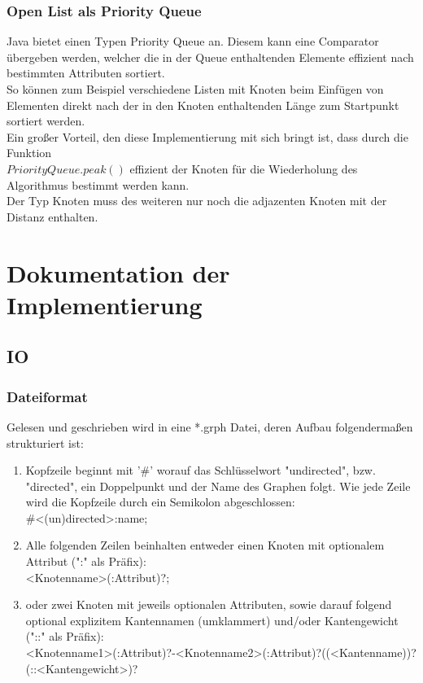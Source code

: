 \documentclass[a4paper]{article}
\begin{document}
\subsubsection{Open List als Priority Queue} \label{priorityQueueSection}

Java bietet einen Typen Priority Queue an. Diesem kann eine Comparator übergeben werden, welcher die in der Queue enthaltenden Elemente effizient nach bestimmten Attributen sortiert.\\
So können zum Beispiel verschiedene Listen mit Knoten beim Einfügen von Elementen direkt nach der in den Knoten enthaltenden Länge zum Startpunkt sortiert werden.\\
Ein großer Vorteil, den diese Implementierung mit sich bringt ist, dass durch die Funktion\\$PriorityQueue.peak()$ effizient der Knoten für die Wiederholung des Algorithmus bestimmt werden kann.\\
Der Typ Knoten muss des weiteren nur noch die adjazenten Knoten mit der Distanz enthalten.\\

\section{Dokumentation der Implementierung}

\subsection{IO}

\subsubsection{Dateiformat}
Gelesen und geschrieben wird in eine *.grph Datei, deren Aufbau folgendermaßen strukturiert ist:
\begin{enumerate}
 	\item Kopfzeile beginnt mit '\#' worauf das Schlüsselwort "undirected", bzw. "directed", ein Doppelpunkt und der Name des Graphen folgt. Wie jede Zeile wird die Kopfzeile durch ein Semikolon abgeschlossen:\\
		\#<(un)directed>:name;
	\item Alle folgenden Zeilen beinhalten entweder einen Knoten mit optionalem Attribut (":" als Präfix):\\
		<Knotenname>(:Attribut)?;\\
	\item oder zwei Knoten mit jeweils optionalen Attributen, sowie darauf folgend optional explizitem Kantennamen (umklammert) und/oder Kantengewicht ("::" als Präfix):\\
		<Knotenname1>(:Attribut)?-<Knotenname2>(:Attribut)?((<Kantenname))?(::<Kantengewicht>)?
\end{enumerate}
\end{document}
